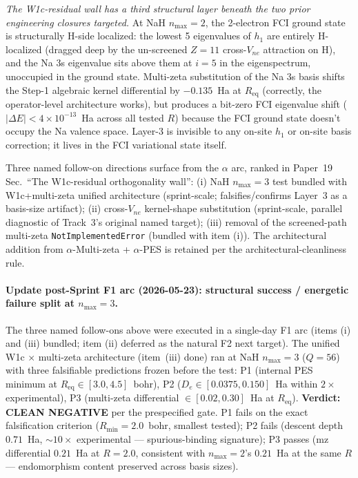 \documentclass[aps,pra,twocolumn,superscriptaddress,longbibliography,floatfix]{revtex4-2}
\begin{document}
\emph{The W1c-residual wall has a third structural layer beneath the
two prior engineering closures targeted.}  At NaH $n_{\max}=2$, the
2-electron FCI ground state is structurally H-side localized: the
lowest 5 eigenvalues of $h_1$ are entirely H-localized (dragged deep
by the un-screened $Z = 11$ cross-$V_{ne}$ attraction on H), and the
Na 3s eigenvalue sits above them at $i = 5$ in the eigenspectrum,
unoccupied in the ground state.  Multi-zeta substitution of the Na 3s
basis shifts the Step-1 algebraic kernel differential by $-0.135$~Ha
at $R_\text{eq}$ (correctly, the operator-level architecture works),
but produces a bit-zero FCI eigenvalue shift ($|\Delta E| < 4 \times
10^{-13}$~Ha across all tested $R$) because the FCI ground state
doesn't occupy the Na valence space.  Layer-3 is invisible to any
on-site $h_1$ or on-site basis correction; it lives in the FCI
variational state itself.

Three named follow-on directions surface from the $\alpha$ arc, ranked
in Paper~19 Sec.~``The W1c-residual orthogonality wall'': (i) NaH $n_{\max}=3$ test
bundled with W1c+multi-zeta unified architecture
(sprint-scale; falsifies/confirms Layer~3 as a basis-size artifact);
(ii) cross-$V_{ne}$ kernel-shape substitution
(sprint-scale, parallel diagnostic of Track~3's original named
target); (iii) removal of the screened-path multi-zeta
\texttt{NotImplementedError} (bundled with item (i)).
The architectural addition from $\alpha$-Multi-zeta + $\alpha$-PES is
retained per the architectural-cleanliness rule.

\paragraph{Update post-Sprint F1 arc (2026-05-23): structural success / energetic
failure split at $n_{\max}=3$.}
The three named follow-ons above were executed in a single-day F1 arc
(items (i) and (iii) bundled; item (ii) deferred as the natural F2 next
target). The unified W1c $\times$ multi-zeta architecture (item~(iii)
done) ran at NaH $n_{\max}=3$ ($Q = 56$) with three falsifiable
predictions frozen before the test: P1 (internal PES minimum at
$R_\text{eq} \in [3.0, 4.5]$~bohr), P2 ($D_e \in [0.0375, 0.150]$~Ha
within $2\times$ experimental), P3 (multi-zeta differential $\in
[0.02, 0.30]$~Ha at $R_\text{eq}$). \textbf{Verdict: CLEAN NEGATIVE} per
the prespecified gate. P1 fails on the exact falsification criterion
($R_\text{min} = 2.0$~bohr, smallest tested); P2 fails (descent depth
$0.71$~Ha, $\sim 10\times$ experimental --- spurious-binding signature);
P3 passes (mz differential $0.21$~Ha at $R = 2.0$, consistent with
$n_{\max}=2$'s $0.21$~Ha at the same $R$ --- endomorphism content
preserved across basis sizes).
\end{document}

